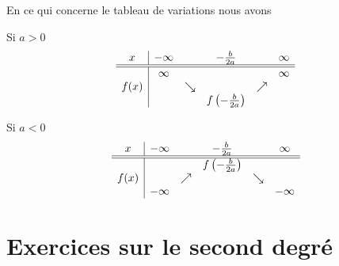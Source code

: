     En ce qui concerne le tableau de variations nous avons
    \begin{multicols}{2}
        \begin{center}
            

            Si \( a>0\)
            \begin{equation*}
                \begin{array}[]{c|ccccc}
                    x&-\infty&&-\frac{ b }{ 2a }&&\infty\\
                    \hline\hline
                    &\infty&&&&\infty\\
                    f(x)&&\searrow&&\nearrow&\\
                    &&&f\left( -\frac{ b }{ 2a } \right)&&\\
                \end{array}
            \end{equation*}
            \columnbreak

            Si \( a<0\)
            \begin{equation*}
                \begin{array}[]{c|ccccc}
                    x&-\infty&&-\frac{ b }{ 2a }&&\infty\\
                    \hline\hline
                    &&&f\left( -\frac{ b }{ 2a } \right)&&\\
                    f(x)&&\nearrow&&\searrow&\\
                    &-\infty&&&&-\infty\\
                \end{array}
            \end{equation*}
            
        \end{center}
    \end{multicols}

\section{Exercices sur le second degré}



